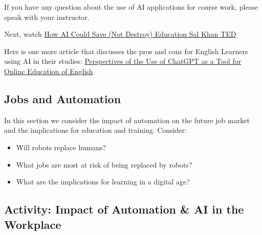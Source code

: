 \documentclass[
]{book}
\providecommand{\tightlist}{%
  \setlength{\itemsep}{0pt}\setlength{\parskip}{0pt}}
\theoremstyle{definition}
\theoremstyle{definition}
\theoremstyle{definition}
\theoremstyle{definition}
\theoremstyle{remark}
\begin{document}
\begin{reflect}
If you have any question about the use of AI applications for course work, please speak with your instructor.

Next, watch \href{https://www.youtube.com/watch?v=hJP5GqnTrNo}{How AI Could Save (Not Destroy) Education \textbar{} Sal Khan \textbar{} TED}

Here is one more article that discusses the pros and cons for English Learners using AI in their studies: \href{https://www.researchgate.net/publication/374483468_Perspectives_of_the_Use_of_ChatGPT_as_a_Tool_for_Online_Education_of_English}{Perspectives of the Use of ChatGPT as a Tool for Online Education of English}
\end{reflect}

\hypertarget{jobs-and-automation}{%
\subsection*{Jobs and Automation}\label{jobs-and-automation}}

In this section we consider the impact of automation on the future job market and the implications for education and training. Consider:

\begin{itemize}
\tightlist
\item
  Will robots replace humans?\\
\item
  What jobs are most at risk of being replaced by robots?\\
\item
  What are the implications for learning in a digital age?
\end{itemize}

\hypertarget{activity-impact-of-automation-ai-in-the-workplace}{%
\subsection*{Activity: Impact of Automation \& AI in the Workplace}\label{activity-impact-of-automation-ai-in-the-workplace}}
\end{document}
